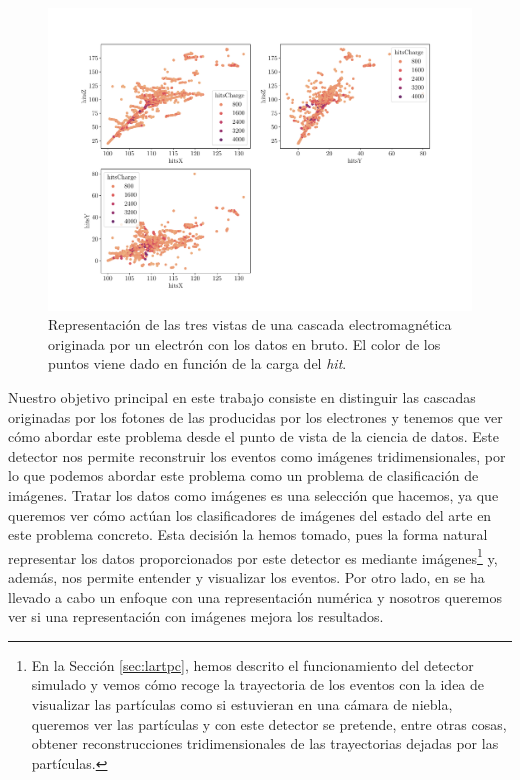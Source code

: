 \documentclass[a4paper,12pt,oneside,titlepage]{book}
\begin{document}
\begin{figure}[h!]
  \centering
  \includegraphics[scale=0.65, center]{vistas_3.pdf}
  \caption{Representación de las tres vistas de una cascada electromagnética originada por un electrón con los datos en bruto. El color de los puntos viene dado en función de la carga del \textit{hit}.}
  \label{fig:vistas}
\end{figure}

Nuestro objetivo principal en este trabajo consiste en distinguir las cascadas originadas por los fotones de las producidas por los electrones y tenemos que ver cómo abordar este problema desde el punto de vista de la ciencia de datos. Este detector nos permite reconstruir los eventos como imágenes tridimensionales, por lo que podemos abordar este problema como un problema de clasificación de imágenes. Tratar los datos como imágenes es una selección que hacemos, ya que queremos ver cómo actúan los clasificadores de imágenes del estado del arte en este problema concreto. Esta decisión la hemos tomado, pues la forma natural representar los datos proporcionados por este detector es mediante imágenes\footnote{En la Sección \ref{sec:lartpc}, hemos descrito el funcionamiento del detector simulado y vemos cómo recoge la trayectoria de los eventos con la idea de visualizar las partículas como si estuvieran en una cámara de niebla, queremos ver las partículas y con este detector se pretende, entre otras cosas, obtener reconstrucciones tridimensionales de las trayectorias dejadas por las partículas.} y, además, nos permite entender y visualizar los eventos. Por otro lado, en \cite{auu} se ha llevado a cabo un enfoque con una representación numérica y nosotros queremos ver si una representación con imágenes mejora los resultados. %
\end{document}
